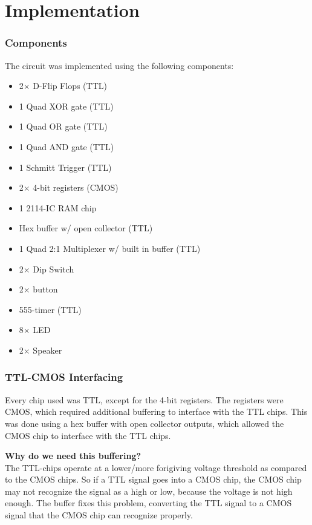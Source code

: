 \documentclass{article}
\begin{document}
        
    \section{Implementation}  
        \subsubsection{Components}
            The circuit was implemented using the following components:
            \begin{itemize}
                \item 2$\times$ D-Flip Flops (TTL)
                \item 1 Quad XOR gate (TTL)
                \item 1 Quad OR gate (TTL)
                \item 1 Quad AND gate (TTL)
                \item 1 Schmitt Trigger (TTL)
                \item 2$\times$ 4-bit registers (CMOS)
                \item 1 2114-IC RAM chip
                \item Hex buffer w/ open collector (TTL)
                \item 1 Quad 2:1 Multiplexer w/ built in buffer (TTL)
                \item 2$\times$ Dip Switch
                \item 2$\times$ button
                \item 555-timer (TTL)
                \item 8$\times$ LED
                \item 2$\times$ Speaker
            \end{itemize}
        \subsubsection{TTL-CMOS Interfacing}
            Every chip used was TTL, except for the 4-bit registers. The registers were CMOS, which required additional buffering to interface with the TTL chips. This was done using a hex buffer with open collector outputs, which allowed the CMOS chip to interface with the TTL chips.

            \textbf{Why do we need this buffering?}\\
            The TTL-chips operate at a lower/more forigiving voltage threshold as compared to the CMOS chips. So if a TTL signal goes into a CMOS chip, the CMOS chip may not recognize the signal as a high or low, because the voltage is not high enough. 
            The buffer fixes this problem, converting the TTL signal to a CMOS signal that the CMOS chip can recognize properly.\\    
        
\end{document}
